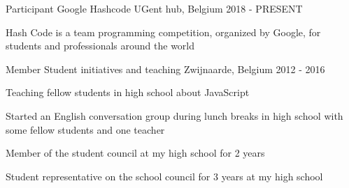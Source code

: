 

\begin{cventries}

  \cventry
    {Participant} %
    {Google Hashcode} %
    {UGent hub, Belgium} %
    {2018 - PRESENT} %
    {
      \begin{cvitems} %
      Hash Code is a team programming competition, organized by Google, for students and professionals around the world
      \end{cvitems}
    }

  \cventry
    {Member} %
    {Student initiatives and teaching} %
    {Zwijnaarde, Belgium} %
    {2012 - 2016} %
    {
      \begin{cvitems} %
         \item Teaching fellow students in high school about JavaScript
         \item Started an English conversation group during lunch breaks in high school with some fellow students and one teacher
         \item Member of the student council at my high school for 2 years
         \item Student representative on the school council for 3 years at my high school
      \end{cvitems}
    }

\end{cventries}
